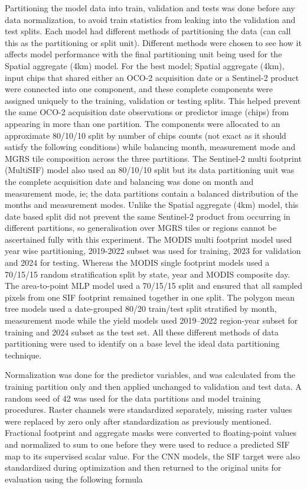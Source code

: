 Partitioning the model data into train, validation and tests was done before any data normalization, to avoid train statistics from leaking into the validation and test splits. Each model had different methods of partitioning the data (can call this as the partitioning or split unit). Different methods were chosen to see how it affects model performance with the final partitioning unit being used for the Spatial aggregate (4km) model. For the best model; Spatial aggregate (4km), input chips that shared either an OCO-2 acquisition date or a Sentinel-2 product were connected into one component, and these complete components were assigned uniquely to the training, validation or testing splits. This helped prevent the same OCO-2 acquisition date observations or predictor image (chips) from appearing in more than one partition. The components were allocated to an approximate 80/10/10 split by number of chips counts (not exact as it should satisfy the following conditions) while balancing month, measurement mode and MGRS tile composition across the three partitions. The Sentinel-2 multi footprint (MultiSIF) model also used an 80/10/10 split but its data partitioning unit was the complete acquisition date and balancing was done on month and measurement mode, ie; the data partitions contain a balanced distribution of the months and measurement modes. Unlike the  Spatial aggregate (4km) model, this date based split did not prevent the same Sentinel-2 product from occurring in different partitions, so generalisation over MGRS tiles or regions cannot be ascertained fully with this experiment. The MODIS multi footprint model used year wise partitioning, 2019-2022 subset was used for training, 2023 for validation and 2024 for testing. Whereas the MODIS single footprint models used a 70/15/15 random stratification split by state, year and MODIS composite day. The area-to-point MLP model used a 70/15/15 split and ensured that all sampled pixels from one SIF footprint remained together in one split. The polygon mean tree models used a date-grouped 80/20 train/test split stratified by month, measurement mode while the yield models used 2019–2022 region-year subset for training and 2024 subset as the test set. All these different methods of data partitioning were used to identify on a base level the ideal data partitioning technique. 

Normalization was done for the predictor variables, and was calculated from the training partition only and then applied unchanged to validation and test data. A random seed of 42 was used for the data partitions and model training procedures. Raster channels were standardized separately, missing raster values were replaced by zero only after standardization as previously mentioned. Fractional footprint and aggregate masks were converted to floating-point values and normalized to sum to one before they were used to reduce a predicted SIF map to its supervised scalar value. For the CNN models, the SIF target were also standardized during optimization and then returned to the original units for evaluation using the following formula

